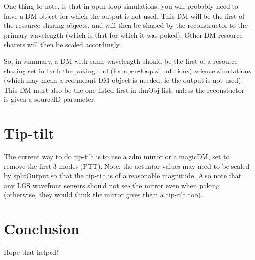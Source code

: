 \documentclass{article}
\begin{document}
One thing to note, is that in open-loop simulations, you will probably
need to have a DM object for which the output is not used.  This DM
will be the first of the resource sharing objects, and will then be
shaped by the reconstructor to the primary wavelength (which is that
for which it was poked).  Other DM resource sharers will then be
scaled accordingly.

So, in summary, a DM with same wavelength should be the first of a
resource sharing set in both the poking and (for open-loop
simulations) science simulations (which may mean a redundant DM object
is needed, ie the output is not used).  This DM must also be the one
listed first in dmObj list, unless the reconstuctor is given a
sourceID parameter.

\section{Tip-tilt}
The current way to do tip-tilt is to use a zdm mirror or a magicDM,
set to remove the first 3 modes (PTT).  Note, the actuator values may
need to be scaled by splitOutput so that the tip-tilt is of a
reasonable magnitude.  Also note that any LGS wavefront sensors should
not see the mirror even when poking (otherwise, they would think the
mirror gives them a tip-tilt too).



\section{Conclusion}
Hope that helped!



\printindex
\end{document}
